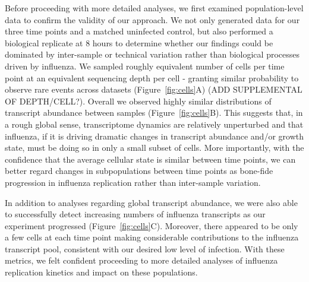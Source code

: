 \documentclass[9pt,lineno]{elife}
\begin{document}
Before proceeding with more detailed analyses, we first examined population-level data to confirm the validity of our approach. 
We not only generated data for our three time points and a matched uninfected control, but also performed a biological replicate at 8 hours to determine whether our findings could be dominated by inter-sample or technical variation rather than biological processes driven by influenza. 
We sampled roughly equivalent number of cells per time point at an equivalent sequencing depth per cell - granting similar probability to observe rare events across datasets (Figure~\ref{fig:cells}A) (ADD SUPPLEMENTAL OF DEPTH/CELL?). 
Overall we observed highly similar distributions of transcript abundance between samples (Figure~\ref{fig:cells}B). 
This suggests that, in a rough global sense, transcriptome dynamics are relatively unperturbed and that influenza, if it is driving dramatic changes in transcript abundance and/or growth state, must be doing so in only a small subset of cells. 
More importantly, with the confidence that the average cellular state is similar between time points, we can better regard changes in subpopulations between time points as bone-fide progression in influenza replication rather than inter-sample variation.

In addition to analyses regarding global transcript abundance, we were also able to successfully detect increasing numbers of influenza transcripts as our experiment progressed (Figure~\ref{fig:cells}C). 
Moreover, there appeared to be only a few cells at each time point making considerable contributions to the influenza transcript pool, consistent with our desired low level of infection. 
With these metrics, we felt confident proceeding to more detailed analyses of influenza replication kinetics and impact on these populations.
\end{document}
